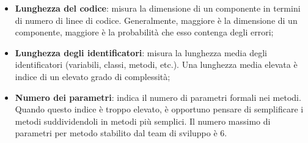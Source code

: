 \begin{itemize}
	\begin{itemize}
		\item \textbf{Lunghezza del codice}: misura la dimensione di un componente in termini di numero di linee di codice. Generalmente, maggiore è la dimensione di un componente, maggiore è la probabilità che esso contenga degli errori;
		\item \textbf{Lunghezza degli identificatori}: misura la lunghezza media degli identificatori (variabili, classi, metodi, etc.). Una lunghezza media elevata è indice di un elevato grado di complessità;
		\item \textbf{Numero dei parametri}: indica il numero di parametri formali nei metodi. Quando questo indice è troppo elevato, è opportuno pensare di semplificare i metodi suddividendoli in metodi più semplici. Il numero massimo di parametri per metodo stabilito dal team di sviluppo è 6.
	\end{itemize}
\end{itemize}
